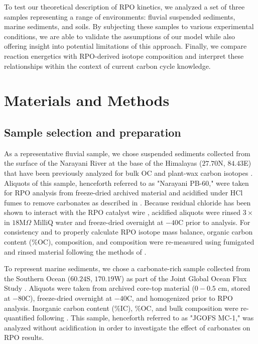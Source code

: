 To test our theoretical description of RPO kinetics, we analyzed a set of three samples representing a range of environments: fluvial suspended sediments, marine sediments, and soils. By subjecting these samples to various experimental conditions, we are able to validate the assumptions of our model while also offering insight into potential limitations of this approach. Finally, we compare reaction energetics with RPO-derived isotope composition and interpret these relationships within the context of current carbon cycle knowledge.

\section{Materials and Methods}

\subsection{Sample selection and preparation}

As a representative fluvial sample, we chose suspended sediments collected from the surface of the Narayani River at the base of the Himalayas ($27.70$\textdegree N, $84.43$\textdegree E) that have been previously analyzed for bulk OC and plant-wax carbon isotopes \citep{Galy:2008jw,Galy:2011hk,Galy:2011ix}. Aliquots of this sample, henceforth referred to as "Narayani PB-60," were taken for RPO analysis from freeze-dried archived material and acidified under HCl fumes to remove carbonates as described in \citet{Whiteside:2011jea}. Because residual chloride has been shown to interact with the RPO catalyst wire \citep{Hemingway:2016rc}, acidified aliquots were rinsed $3\times$ in $18$M$\Omega$ MilliQ water and freeze-dried overnight at $-40$\textdegree C prior to analysis. For consistency and to properly calculate RPO isotope mass balance, organic carbon content (\%OC),  composition, and  composition were re-measured using fumigated and rinsed material following the methods of \citet{McNichol:1994dt,McNichol:1994ty}.

To represent marine sediments, we chose a carbonate-rich sample collected from the Southern Ocean ($60.24$\textdegree S, $170.19$\textdegree W) as part of the Joint Global Ocean Flux Study \citep[JGOFS;][]{Sayles:2001ua}. Aliquots were taken from archived core-top material ($0 - 0.5$ cm, stored at $-80$\textdegree C), freeze-dried overnight at $-40$\textdegree C, and homogenized prior to RPO analysis. Inorganic carbon content (\%IC), \%OC, and bulk  composition were re-quantified following \citet{McNichol:1994dt}. This sample, henceforth referred to as "JGOFS MC-1," was analyzed without acidification in order to investigate the effect of carbonates on RPO results.

